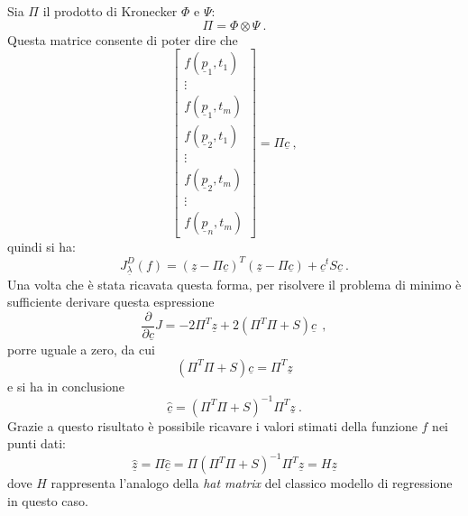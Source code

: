 \documentclass[a4paper,11pt,twoside,openright]{book}							%
\begin{document}
Sia $\Pi$ il prodotto di Kronecker $\Phi$ e $\Psi$:
$$ \Pi = \Phi \otimes \Psi \ .$$
Questa matrice consente di poter dire che
\begin{equation}
\begin{bmatrix}
f(\underline p_1,t_1)  \\
\vdots\\
f(\underline p_1,t_m)  \\
f(\underline p_2,t_1)  \\
\vdots\\
f(\underline p_2,t_m)  \\
\vdots\\
f(\underline p_n,t_m)
\end{bmatrix}= \Pi \underline c \ ,
\end{equation} 
quindi si ha:
\begin{equation} 
\label{eq:Jmatr}
J_{\underline \lambda }^D(f) = (\underline z - \Pi \underline c)^T (\underline z - \Pi \underline c) + \underline c^t S \underline c \ .
\end{equation}
Una volta che è stata ricavata questa forma, per risolvere il problema di minimo è sufficiente derivare questa espressione
$$
\frac{\partial}{\partial \underline c}J= -2 \Pi^T \underline z + 2(\Pi^T \Pi + S) \underline c \ \ ,
$$
porre uguale a zero, da cui
\begin{equation}
(\Pi^T \Pi + S) \underline c = \Pi^T\underline z
\end{equation} 
e si ha in conclusione
$$ \hat  {\underline c} = (\Pi^T \Pi + S)^{-1}\Pi^T \underline z \ .$$
Grazie a questo risultato è possibile ricavare i valori stimati della funzione $f$ nei punti dati:
$$
\hat  {\underline z} =\Pi\hat  {\underline c} = \Pi(\Pi^T \Pi + S)^{-1}\Pi^T \underline z = H\underline{z}
$$
dove $H$ rappresenta l'analogo della \textit{hat matrix} del classico modello di regressione in questo caso.
\end{document}
